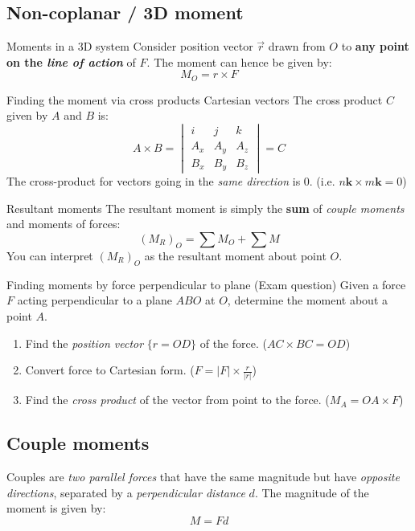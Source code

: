 \subsection{Non-coplanar / 3D moment}
\begin{definition}
    {Moments in a 3D system}
    Consider position vector $\vec{r}$ drawn from $O$ to \textbf{any point on the \emph{line of action}} of $F$. The moment can hence be given by:
    \[M_O=r\times F\]
\end{definition}
\begin{definition}
    {Finding the moment via cross products Cartesian vectors}
    The cross product $C$ given by $A$ and $B$ is:
    \[A\times B=\begin{vmatrix}
            i   & j   & k   \\
            A_x & A_y & A_z \\
            B_x & B_y & B_z
        \end{vmatrix}=C\]
    The cross-product for vectors going in the \emph{same direction} is 0. (i.e. $n\boldsymbol{k}\times m\boldsymbol{k}=0$)
\end{definition}
\begin{knBox}
    {Resultant moments}
    The resultant moment is simply the \textbf{sum} of \emph{couple moments} and moments of forces:
    \[(M_R)_O=\sum M_O + \sum M\]
    You can interpret $(M_R)_O$ as the resultant moment about point $O$.
\end{knBox}
\begin{knBox}
    {Finding moments by force perpendicular to plane}
    (Exam question) Given a force $F$ acting perpendicular to a plane $ABO$ at $O$, determine the moment about a point $A$.
    \begin{enumerate}
        \item Find the \emph{position vector} $\{r=OD\}$ of the force. ($AC\times BC=OD$)
        \item Convert force to Cartesian form. ($F=|F|\times\frac{r}{|r|}$)
        \item Find the \emph{cross product} of the vector from point to the force. ($M_A=OA\times F$)
    \end{enumerate}
\end{knBox}

\subsection{Couple moments}
Couples are \emph{two parallel forces} that have the same magnitude but have \emph{opposite directions}, separated by a \emph{perpendicular distance} $d$. The magnitude of the moment is given by:
\[M=Fd\]

